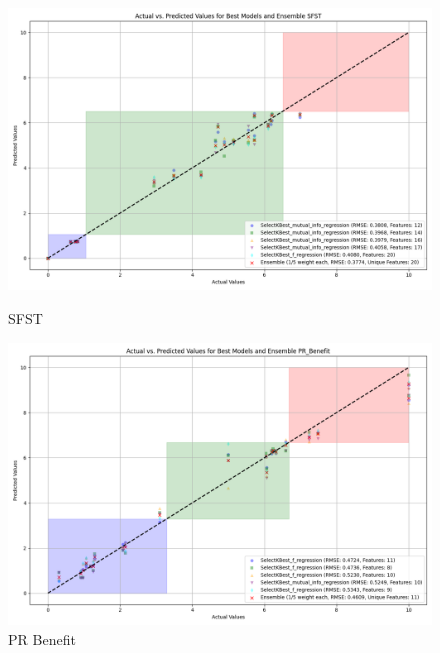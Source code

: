 \begin{figure}[H]
    \centering
    \begin{minipage}{0.45\textwidth}
        \centering
        \includegraphics[width=\linewidth]{reg_section_specific/images_reg_featred_ensemble/actual_vs_predicted_best_feature_selection_and_ensemble_SFST.png}
        \caption{SFST}
        \label{fig_reg_spec:sfst_reg_featred_best_ensemble}
    \end{minipage}\hfill
    \begin{minipage}{0.45\textwidth}
        \centering
        \includegraphics[width=\linewidth]{reg_section_specific/images_reg_featred_ensemble/actual_vs_predicted_best_feature_selection_and_ensemble_PR_Benefit.png}
        \caption{PR Benefit}
        \label{fig_reg_spec:pr_ben_reg_featred_best_ensemble}
    \end{minipage}
\end{figure}

